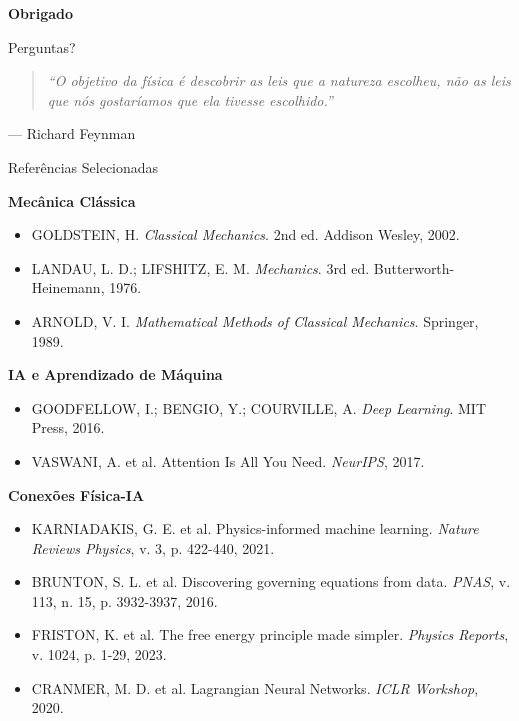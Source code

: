\documentclass[aspectratio=169,12pt]{beamer}
\begin{document}
\begin{frame}
    \centering
    \vfill

    {\Huge\textbf{Obrigado}}

    \vspace{1cm}

    {\Large Perguntas?}

    \vfill

    \begin{quote}
        \itshape
        ``O objetivo da física é descobrir as leis que a natureza escolheu, não as leis que nós gostaríamos que ela tivesse escolhido.''
    \end{quote}
    \hfill --- Richard Feynman

    \vfill
\end{frame}

\begin{frame}[allowframebreaks]{Referências Selecionadas}
    \footnotesize

    \textbf{Mecânica Clássica}
    \begin{itemize}
        \item GOLDSTEIN, H. \textit{Classical Mechanics}. 2nd ed. Addison Wesley, 2002.
        \item LANDAU, L. D.; LIFSHITZ, E. M. \textit{Mechanics}. 3rd ed. Butterworth-Heinemann, 1976.
        \item ARNOLD, V. I. \textit{Mathematical Methods of Classical Mechanics}. Springer, 1989.
    \end{itemize}

    \framebreak

    \textbf{IA e Aprendizado de Máquina}
    \begin{itemize}
        \item GOODFELLOW, I.; BENGIO, Y.; COURVILLE, A. \textit{Deep Learning}. MIT Press, 2016.
        \item VASWANI, A. et al. Attention Is All You Need. \textit{NeurIPS}, 2017.
    \end{itemize}

    \textbf{Conexões Física-IA}
    \begin{itemize}
        \item KARNIADAKIS, G. E. et al. Physics-informed machine learning. \textit{Nature Reviews Physics}, v. 3, p. 422-440, 2021.
        \item BRUNTON, S. L. et al. Discovering governing equations from data. \textit{PNAS}, v. 113, n. 15, p. 3932-3937, 2016.
        \item FRISTON, K. et al. The free energy principle made simpler. \textit{Physics Reports}, v. 1024, p. 1-29, 2023.
        \item CRANMER, M. D. et al. Lagrangian Neural Networks. \textit{ICLR Workshop}, 2020.
    \end{itemize}
\end{frame}
\end{document}
